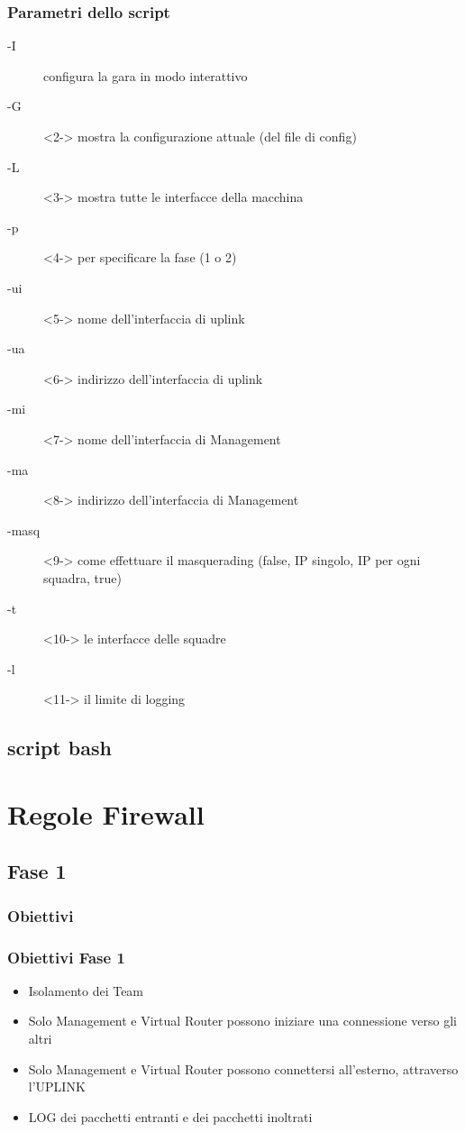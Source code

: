 \documentclass{beamer}
\begin{document}
\begin{frame}[fragile]
    \frametitle{Parametri dello script}
    \begin{description}
        \item[-I] configura la gara in modo interattivo
        \item[-G]<2-> mostra la configurazione attuale (del file di config)
        \item[-L]<3-> mostra tutte le interfacce della macchina
        \item[-p]<4-> per specificare la fase (1 o 2)
        \item[-ui]<5-> nome dell'interfaccia di uplink
        \item[-ua]<6-> indirizzo dell'interfaccia di uplink
        \item[-mi]<7-> nome dell'interfaccia di Management
        \item[-ma]<8-> indirizzo dell'interfaccia di Management
        \item[-masq]<9-> come effettuare il masquerading (false, IP singolo, IP per ogni squadra, true)
        \item[-t]<10-> le interfacce delle squadre
        \item[-l]<11-> il limite di logging
    \end{description}

    

\end{frame}



\subsection*{script bash}


\section{Regole Firewall}




\subsection{Fase 1}
\subsubsection{Obiettivi}
\begin{frame}
    \frametitle{Obiettivi Fase 1}
    \begin{itemize}
        \item<1-> Isolamento dei Team
        \item<2-> Solo Management e Virtual Router possono iniziare una connessione verso gli altri
        \item<3-> Solo Management e Virtual Router possono connettersi all'esterno, attraverso l'UPLINK
        \item<4-> LOG dei pacchetti entranti e dei pacchetti inoltrati
    \end{itemize}

\end{frame}
\end{document}
